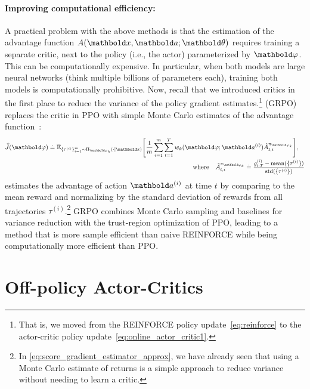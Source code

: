 \paragraph{Improving computational efficiency:}
A practical problem with the above methods is that the estimation of the advantage function $\fnA(\vx, \va; \vtheta)$ requires training a separate critic, next to the policy (i.e., the actor) parameterized by $\vvarphi$.
This can be computationally expensive.
In particular, when both models are large neural networks (think multiple billions of parameters each), training both models is computationally prohibitive.
Now, recall that we introduced critics in the first place to reduce the variance of the policy gradient estimates.\footnote{That is, we moved from the REINFORCE policy update~\eqref{eq:reinforce} to the actor-critic policy update~\eqref{eq:online_actor_critic1}.}
 (GRPO) replaces the critic in PPO with simple Monte Carlo estimates of the advantage function~\citep{shao2024deepseekmath}: \begin{align}
  \begin{multlined}[t]
    \J{\vvarphi} \defeq \E[\{\tau^{(i)}\}_{i=1}^m \sim \altpi_{\vvarphi_k}(\cdot \mid \vx)]{\frac{1}{m} \sum_{i=1}^m \sum_{t=1}^T w_k(\vvarphi; \va^{(i)}) \fnAhat_{t,i}^{\pi_{\vvarphi_k}}}, \\
    \text{where}\quad \fnAhat_{t,i}^{\pi_{\vvarphi_k}} \defeq \text{\small$\frac{g_{t:T}^{(i)} - \mathrm{mean}(\{\tau^{(i)}\})}{\mathrm{std}(\{\tau^{(i)}\})}$}
  \end{multlined}
\end{align} estimates the advantage of action $\va^{(i)}$ at time $t$ by comparing to the mean reward and normalizing by the standard deviation of rewards from all trajectories $\tau^{(i)}$.\footnote{In \cref{eq:score_gradient_estimator_approx}, we have already seen that using a Monte Carlo estimate of returns is a simple approach to reduce variance without needing to learn a critic.}
GRPO combines Monte Carlo sampling and baselines for variance reduction with the trust-region optimization of PPO, leading to a method that is more sample efficient than naive REINFORCE while being computationally more efficient than PPO.

\section{Off-policy Actor-Critics}\label{sec:mfarl:off_policy_actor_critic_methods}

